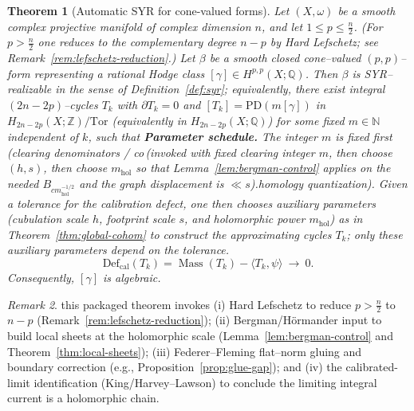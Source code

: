 \documentclass[11pt]{article}
\numberwithin{equation}{section}  %
\theoremstyle{plain}
\newtheorem{theorem}{Theorem}[section]
\theoremstyle{definition}
\theoremstyle{remark}
\newtheorem{remark}[theorem]{Remark}
\newcommand{\Z}{\mathbb{Z}}
\newcommand{\Q}{\mathbb{Q}}
\newcommand{\N}{\mathbb{N}}
\newcommand{\mhol}{m_{\mathrm{hol}}} %
\DeclareMathOperator{\Mass}{Mass}
\newcommand{\Def}{\mathrm{Def}}
\begin{document}
\begin{theorem}[Automatic SYR for cone-valued forms]\label{thm:automatic-syr}
Let $(X,\omega)$ be a smooth complex projective manifold of complex
dimension $n$, and let $1\le p\le \frac{n}{2}$.
(For $p>\frac{n}{2}$ one reduces to the complementary degree $n-p$ by Hard Lefschetz; see Remark~\ref{rem:lefschetz-reduction}.)
Let $\beta$ be a smooth closed cone--valued $(p,p)$--form representing a rational Hodge class $[\gamma]\in H^{p,p}(X;\Q)$.
Then $\beta$ is SYR--realizable in the sense of Definition~\ref{def:syr}; equivalently,
there exist integral $(2n-2p)$--cycles $T_k$ with $\partial T_k=0$ and
$[T_k]=\mathrm{PD}(m[\gamma])$ in $H_{2n-2p}(X;\Z)/\mathrm{Tor}$ (equivalently in $H_{2n-2p}(X;\Q)$) for some fixed $m\in\N$ independent of $k$, such that
{\noindent\textbf{Parameter schedule.} The integer $m$ is fixed first (clearing denominators / co{\,(invoked with fixed clearing integer $m$, then choose $(h,s)$, then choose $\mhol$ so that Lemma~\ref{lem:bergman-control} applies on the needed $B_{c\mhol^{-1/2}}$ and the graph displacement is $\ll s$).}homology quantization).  Given a tolerance for the calibration defect, one then chooses auxiliary parameters (cubulation scale $h$, footprint scale $s$, and holomorphic power $\mhol$) as in Theorem~\ref{thm:global-cohom} to construct the approximating cycles $T_k$; only these auxiliary parameters depend on the tolerance.}
\[
\Def_{\mathrm{cal}}(T_k)=\Mass(T_k)-\langle T_k,\psi\rangle\ \longrightarrow\ 0.
\]
Consequently, $[\gamma]$ is algebraic.
\end{theorem}
\begin{remark}\label{rem:automatic-syr-comment}
this packaged theorem invokes (i) Hard Lefschetz to reduce $p>\frac n2$ to $n-p$ (Remark~\ref{rem:lefschetz-reduction}); (ii) Bergman/H\"ormander input to build local sheets at the holomorphic scale (Lemma~\ref{lem:bergman-control} and Theorem~\ref{thm:local-sheets}); (iii) Federer--Fleming flat--norm gluing and boundary correction (e.g., Proposition~\ref{prop:glue-gap}); and (iv) the calibrated-limit identification (King/Harvey--Lawson) to conclude the limiting integral current is a holomorphic chain.
\end{remark}
\end{document}
